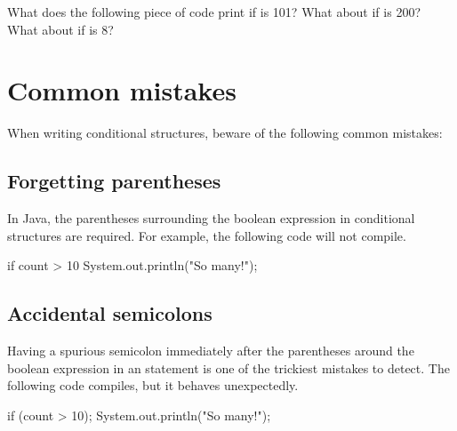 \begin{exercise}
What does the following piece of code print if  is 101? What about if  is 200? What about if  is 8?





\end{exercise}






\section{Common mistakes}
When writing conditional structures, beware of the following common  mistakes:

\subsection{Forgetting parentheses}
In Java, the parentheses surrounding the boolean expression in conditional structures are required. For example, the following code will not compile.
\begin{code}
if count > 10
    System.out.println("So many!");
\end{code}

\subsection{Accidental semicolons}
Having a spurious semicolon immediately after the parentheses around the boolean expression in an  statement is one of the trickiest mistakes to detect. The following code compiles, but it behaves unexpectedly. 
\begin{code}
if (count > 10);
    System.out.println("So many!");
\end{code}


